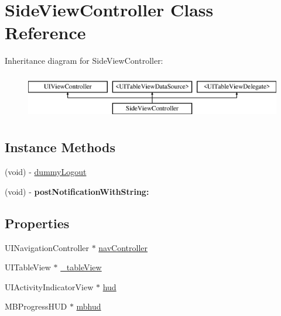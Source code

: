 \hypertarget{interface_side_view_controller}{}\section{Side\+View\+Controller Class Reference}
\label{interface_side_view_controller}
Inheritance diagram for Side\+View\+Controller\+:\begin{figure}[H]
\begin{center}
\leavevmode
\includegraphics[height=2.000000cm]{interface_side_view_controller}
\end{center}
\end{figure}
\subsection*{Instance Methods}
\begin{DoxyCompactItemize}
\item 
(void) -\/ \hyperlink{interface_side_view_controller_a203a6b0b7427a87933630ed9165b7cee}{dummy\+Logout}
\item 
\hypertarget{interface_side_view_controller_a57afc4a999c531f7034b028618b6a28d}{}(void) -\/ {\bfseries post\+Notification\+With\+String\+:}\label{interface_side_view_controller_a57afc4a999c531f7034b028618b6a28d}

\end{DoxyCompactItemize}
\subsection*{Properties}
\begin{DoxyCompactItemize}
\item 
U\+I\+Navigation\+Controller $\ast$ \hyperlink{interface_side_view_controller_a274f649758063f778580cb6fe7a5cc70}{nav\+Controller}
\item 
U\+I\+Table\+View $\ast$ \hyperlink{interface_side_view_controller_a2bf845b06b3e420bf99fe64d38b4a278}{\+\_\+table\+View}
\item 
U\+I\+Activity\+Indicator\+View $\ast$ \hyperlink{interface_side_view_controller_a1b42f6b87ff9d31ece2fb924acd0c4d3}{hud}
\item 
M\+B\+Progress\+H\+U\+D $\ast$ \hyperlink{interface_side_view_controller_a9630052069b1e90fca66f009605cff41}{mbhud}
\end{DoxyCompactItemize}


